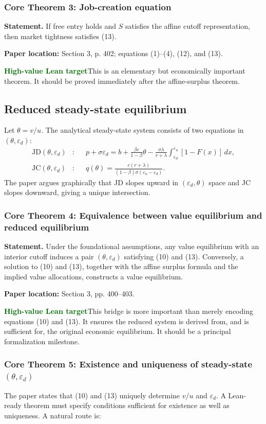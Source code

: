 \documentclass[11pt]{article}
\newcommand{\leanhigh}{\textcolor{darkgreen}{\textbf{High-value Lean target}}}
\newcommand{\papersec}[1]{\textbf{Paper location:} #1}
\newcommand{\statusbox}[2]{\colorbox{#1}{\parbox{0.94\linewidth}{#2}}}
\newcommand{\epsd}{\varepsilon_d}
\newcommand{\epsu}{\varepsilon_u}
\begin{document}
\subsubsection*{Core Theorem 3: Job-creation equation}
\textbf{Statement.} If free entry holds and $S$ satisfies the affine cutoff representation, then market tightness satisfies (13).

\papersec{Section 3, p. 402; equations (1)--(4), (12), and (13).}

\statusbox{softgreen}{\leanhigh\quad This is an elementary but economically important theorem. It should be proved immediately after the affine-surplus theorem.}

\subsection{Reduced steady-state equilibrium}
Let $\theta=v/u$. The analytical steady-state system consists of two equations in $(\theta,\epsd)$:
\begin{align*}
\mathrm{JD}(\theta,\epsd)&:
&&p+\sigma\epsd
=b+\frac{\beta c}{1-\beta}\theta
-\frac{\sigma\lambda}{r+\lambda}
\int_{\epsd}^{\epsu}[1-F(x)]\,dx,\\
\mathrm{JC}(\theta,\epsd)&:
&&q(\theta)=\frac{c(r+\lambda)}{(1-\beta)\sigma(\epsu-\epsd)}.
\end{align*}
The paper argues graphically that JD slopes upward in $(\epsd,\theta)$ space and JC slopes downward, giving a unique intersection.

\subsubsection*{Core Theorem 4: Equivalence between value equilibrium and reduced equilibrium}
\textbf{Statement.} Under the foundational assumptions, any value equilibrium with an interior cutoff induces a pair $(\theta,\epsd)$ satisfying (10) and (13). Conversely, a solution to (10) and (13), together with the affine surplus formula and the implied value allocations, constructs a value equilibrium.

\papersec{Section 3, pp. 400--403.}

\statusbox{softgreen}{\leanhigh\quad This bridge is more important than merely encoding equations (10) and (13). It ensures the reduced system is derived from, and is sufficient for, the original economic equilibrium. It should be a principal formalization milestone.}

\subsubsection*{Core Theorem 5: Existence and uniqueness of steady-state $(\theta,\epsd)$}
The paper states that (10) and (13) uniquely determine $v/u$ and $\epsd$. A Lean-ready theorem must specify conditions sufficient for existence as well as uniqueness. A natural route is:
\end{document}
